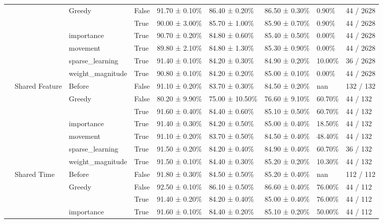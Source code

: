 \begin{tabular}{lllllllll}
\cline{3-9}
 &  & \multirow[t]{2}{*}{Greedy} & False & 91.70 ± 0.10\% & 86.40 ± 0.20\% & 86.50 ± 0.30\% & 0.90\% & 44 / 2628 \\
 &  &  & True & 90.00 ± 3.00\% & 85.70 ± 1.00\% & 85.90 ± 0.70\% & 0.90\% & 44 / 2628 \\
\cline{3-9}
 &  & importance & True & 90.70 ± 0.20\% & 84.80 ± 0.60\% & 85.40 ± 0.50\% & 0.00\% & 44 / 2628 \\
\cline{3-9}
 &  & movement & True & 89.80 ± 2.10\% & 84.80 ± 1.30\% & 85.30 ± 0.90\% & 0.00\% & 44 / 2628 \\
\cline{3-9}
 &  & sparse\_learning & True & 91.40 ± 0.10\% & 84.20 ± 0.30\% & 84.90 ± 0.20\% & 10.00\% & 36 / 2628 \\
\cline{3-9}
 &  & weight\_magnitude & True & 90.80 ± 0.10\% & 84.20 ± 0.20\% & 85.00 ± 0.10\% & 0.00\% & 44 / 2628 \\
\cline{2-9} \cline{3-9}
 & \multirow[t]{7}{*}{Shared Feature} & Before & False & 91.10 ± 0.20\% & 83.70 ± 0.30\% & 84.50 ± 0.20\% & nan & 132 / 132 \\
\cline{3-9}
 &  & \multirow[t]{2}{*}{Greedy} & False & 80.20 ± 9.90\% & 75.00 ± 10.50\% & 76.60 ± 9.10\% & 60.70\% & 44 / 132 \\
 &  &  & True & 91.60 ± 0.40\% & 84.40 ± 0.60\% & 85.10 ± 0.50\% & 60.70\% & 44 / 132 \\
\cline{3-9}
 &  & importance & True & 91.40 ± 0.30\% & 84.20 ± 0.50\% & 85.00 ± 0.40\% & 18.50\% & 44 / 132 \\
\cline{3-9}
 &  & movement & True & 91.10 ± 0.20\% & 83.70 ± 0.50\% & 84.50 ± 0.40\% & 48.40\% & 44 / 132 \\
\cline{3-9}
 &  & sparse\_learning & True & 91.50 ± 0.20\% & 84.20 ± 0.40\% & 84.90 ± 0.40\% & 60.70\% & 36 / 132 \\
\cline{3-9}
 &  & weight\_magnitude & True & 91.50 ± 0.10\% & 84.40 ± 0.30\% & 85.20 ± 0.20\% & 10.30\% & 44 / 132 \\
\cline{2-9} \cline{3-9}
 & \multirow[t]{7}{*}{Shared Time} & Before & False & 91.80 ± 0.30\% & 84.50 ± 0.50\% & 85.20 ± 0.40\% & nan & 112 / 112 \\
\cline{3-9}
 &  & \multirow[t]{2}{*}{Greedy} & False & 92.50 ± 0.10\% & 86.10 ± 0.50\% & 86.60 ± 0.40\% & 76.00\% & 44 / 112 \\
 &  &  & True & 91.40 ± 0.20\% & 84.20 ± 0.40\% & 85.00 ± 0.40\% & 76.00\% & 44 / 112 \\
\cline{3-9}
 &  & importance & True & 91.60 ± 0.10\% & 84.40 ± 0.20\% & 85.10 ± 0.20\% & 50.00\% & 44 / 112 \\

\end{tabular}
